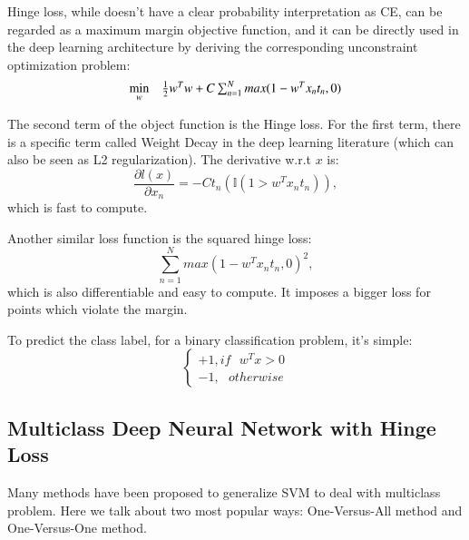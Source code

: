 \documentclass{article} %
\begin{document}
Hinge loss, while doesn't have a clear probability interpretation as CE, can be regarded as a maximum margin objective function, and it can be directly used in the deep learning architecture by deriving the corresponding unconstraint optimization problem:
\begin{equation}
\begin{array}{rrclcl}
\displaystyle \min_{w} & \multicolumn{3}{l}{ \frac{1}{2}w^{T}w+C\sum_{n=1}^{N}max(1-w^{T}x_{n}t_{n},0)}\\

\end{array}
\end{equation}

The second term of the object function is the Hinge loss. For the first term, there is a specific term called Weight Decay in the deep learning literature (which can also be seen as L2 regularization). The derivative w.r.t $x$ is:
\begin{equation}
\frac{\partial l(x)}{\partial x_{n}} = -Ct_{n}(\mathbb{I}(1>w^{T}x_{n}t_{n})),
\end{equation}
which is fast to compute.


Another similar loss function is the squared hinge loss:
\begin{equation}
\sum_{n=1}^{N}max(1-w^{T}x_{n}t_{n},0)^{2},
\end{equation}
which is also differentiable and easy to compute. It imposes a bigger loss for points which violate the margin.


To predict the class label, for a binary classification problem, it's simple:
\begin{equation}
\left\{\begin{matrix}
+1, if \, \, \, \, w^{T}x > 0\\
-1, \, \, \, \, otherwise 

\end{matrix}\right.
\end{equation}

\subsection{Multiclass Deep Neural Network with Hinge Loss}
Many methods have been proposed to generalize SVM to deal with multiclass problem. Here we talk about two most popular ways: One-Versus-All method and One-Versus-One method.
\end{document}
